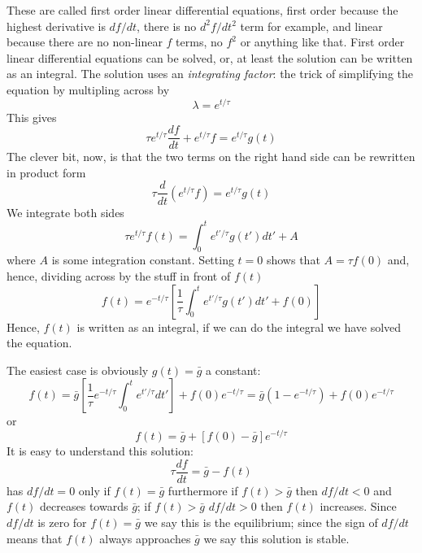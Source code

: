 \documentclass{article}
\begin{document}
These are called first order linear differential equations, first
order because the highest derivative is $df/dt$, there is no
$d^2f/dt^2$ term for example, and linear because there are no
non-linear $f$ terms, no $f^2$ or anything like that. First order
linear differential equations can be solved, or, at least the solution
can be written as an integral. The solution uses an
\textsl{integrating factor}: the trick of simplifying the equation by
multipling across by
\begin{equation}
\lambda=e^{t/\tau}
\end{equation}
This gives
\begin{equation}
\tau e^{t/\tau}\frac{df}{dt}+e^{t/\tau}f=e^{t/\tau}g(t)
\end{equation}
The clever bit, now, is that the two terms on the right hand side can
be rewritten in product form
\begin{equation}
\tau \frac{d}{dt}\left(e^{t/\tau}f\right)=e^{t/\tau}g(t)
\end{equation}
We integrate both sides
\begin{equation}
\tau e^{t/\tau}f(t)=\int_0^t e^{t'/\tau} g(t')dt'+A
\end{equation}
where $A$ is some integration constant. Setting $t=0$ shows that $A=\tau f(0)$ and, hence, dividing across by the stuff in front of $f(t)$
\begin{equation}
f(t)=e^{-t/\tau}\left[\frac{1}{\tau}\int_0^t e^{t'/\tau} g(t')dt'+f(0)\right]
\end{equation}
Hence, $f(t)$ is written as an integral, if we can do the integral we
have solved the equation.

The easiest case is obviously $g(t)=\bar{g}$ a constant:
\begin{equation}
f(t)= \bar{g} \left[\frac{1}{\tau}e^{-t/\tau}\int_0^t e^{t'/\tau}dt'\right]+f(0)e^{-t/\tau}=\bar{g}\left(1-e^{-t/\tau}\right) + f(0)e^{-t/\tau}
\end{equation}
or
\begin{equation}
f(t)=\bar{g}+[f(0)-\bar{g}]e^{-t/\tau}
\end{equation}
It is easy to understand this solution: 
\begin{equation}
\tau\frac{df}{dt}=\bar{g}-f(t)
\end{equation}
has $df/dt=0$ only if $f(t)=\bar{g}$ furthermore if $f(t)>\bar{g}$
then $df/dt<0$ and $f(t)$ decreases towards $\bar{g}$; if
$f(t)>\bar{g}$ $df/dt>0$ then $f(t)$ increases. Since $df/dt$ is zero
for $f(t)=\bar{g}$ we say this is the equilibrium; since the sign of
$df/dt$ means that $f(t)$ always approaches $\bar{g}$ we say this
solution is stable.
\end{document}
